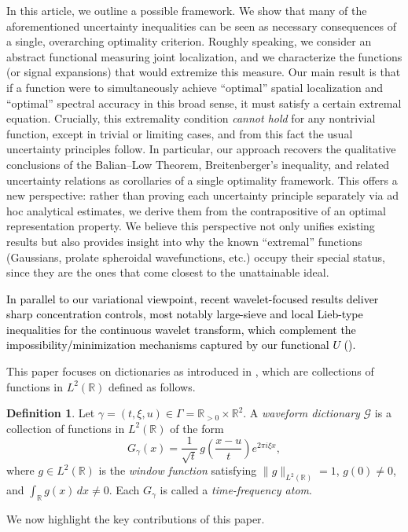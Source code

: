 \documentclass[preprint,hidelinks,authoryear]{elsarticle}
\theoremstyle{plain}
\theoremstyle{definition}
\newtheorem{definition}[theorem]{Definition}
\theoremstyle{remark}
\begin{document}
In this article, we outline a possible framework.  We show that many of the aforementioned uncertainty inequalities can be seen as necessary consequences of a single, overarching optimality criterion.  Roughly speaking, we consider an abstract functional measuring joint localization, and we characterize the functions (or signal expansions) that would extremize this measure.  Our main result is that if a function were to simultaneously achieve “optimal” spatial localization and “optimal” spectral accuracy in this broad sense, it must satisfy a certain extremal equation.  Crucially, this extremality condition \emph{cannot hold} for any nontrivial function, except in trivial or limiting cases, and from this fact the usual uncertainty principles follow.  In particular, our approach recovers the qualitative conclusions of the Balian–Low Theorem, Breitenberger’s inequality, and related uncertainty relations as corollaries of a single optimality framework.  This offers a new perspective: rather than proving each uncertainty principle separately via ad hoc analytical estimates, we derive them from the contrapositive of an optimal representation property. We believe this perspective not only unifies existing results but also provides insight into why the known “extremal” functions (Gaussians, prolate spheroidal wavefunctions, etc.) occupy their special status, since they are the ones that come closest to the unattainable ideal. 


\textcolor{black}{In parallel to our variational viewpoint, recent wavelet-focused results deliver sharp concentration controls, most notably large-sieve and local Lieb-type inequalities for the continuous wavelet transform, which complement the impossibility/minimization mechanisms captured by our functional $U$ (\cite{abreu2025donoho}).}


This paper focuses on dictionaries as introduced in \cite{rivero2023solution}, which are collections of functions in $L^2(\mathbb{R})$ defined as follows.
\begin{definition}
    Let $\gamma = (t, \xi, u) \in \Gamma = \mathbb{R}_{>0} \times \mathbb{R}^2$. A \emph{waveform dictionary} $\mathcal{G}$ is a collection of functions in $L^2(\mathbb{R})$ of the form
$$
G_\gamma(x) = \frac{1}{\sqrt{t}}\, g\left(\frac{x - u}{t}\right) e^{2\pi i \xi x},
$$
where $g \in L^2(\mathbb{R})$ is the \emph{window function} satisfying $\|g\|_{L^2(\mathbb{R})} = 1$, $g(0) \neq 0$, and $\int_\mathbb{R} g(x)\,dx \neq 0$. Each $G_\gamma$ is called a \emph{time-frequency atom}.
\end{definition}
We now highlight the key contributions of this paper.
\end{document}
